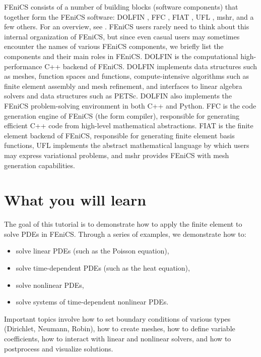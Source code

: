 \documentclass[graybox,envcountchap,sectrefs,final]{svmonodo}
\begin{document}
FEniCS consists of a number of building blocks (software components)
that together form the FEniCS software: DOLFIN \cite{DOLFIN}, FFC
\cite{FFC}, FIAT \cite{FIAT}, UFL \cite{UFL_2014}, mshr,
and a few others. For an overview, see \cite{FEniCS}.
FEniCS users rarely need to think about this
internal organization of FEniCS, but since even casual users may
sometimes encounter the names of various FEniCS components, we briefly
list the components and their main roles in FEniCS. DOLFIN is the
computational high-performance C++ backend of FEniCS. DOLFIN
implements data structures such as meshes, function spaces and
functions, compute-intensive algorithms such as finite element
assembly and mesh refinement, and interfaces to linear algebra solvers
and data structures such as PETSc. DOLFIN also implements the FEniCS
problem-solving environment in both C++ and Python. FFC is the code
generation engine of FEniCS (the form compiler), responsible for
generating efficient C++ code from high-level mathematical
abstractions. FIAT is the finite element backend of FEniCS,
responsible for generating finite element basis functions, UFL
implements the abstract mathematical language by which users may
express variational problems, and mshr provides FEniCS with
mesh generation capabilities.

\section{What you will learn}

The goal of this tutorial is to demonstrate how to apply the
finite element to solve PDEs in FEniCS. Through a series of
examples, we demonstrate how to:

\begin{itemize}
  \item solve linear PDEs (such as the Poisson equation),

  \item solve time-dependent PDEs (such as the heat equation),

  \item solve nonlinear PDEs,

  \item solve systems of time-dependent nonlinear PDEs.
\end{itemize}

\noindent
Important topics involve how to set boundary conditions of various
types (Dirichlet, Neumann, Robin), how to create meshes, how to
define variable coefficients, how to interact with linear and
nonlinear solvers, and how to postprocess and visualize solutions.
\end{document}
